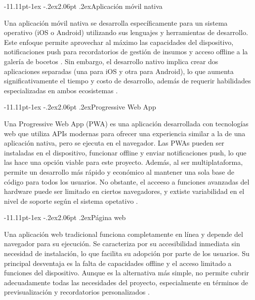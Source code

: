 \documentclass[12pt,letterpaper,oneside]{report}
\makeatletter
\renewcommand\subsection{\@startsection{subsection}{2}{\z@}%
  {-11.11pt\@plus -1ex \@minus -.2ex}{2.06pt \@plus .2ex}{\normalfont\normalsize\bfseries}}
\makeatother
\begin{document}
\subsection{Aplicación móvil nativa }

Una aplicación móvil nativa se desarrolla específicamente para un sistema operativo (iOS o Android) utilizando sus lenguajes y herramientas de desarrollo. Este enfoque permite aprovechar al máximo las capacidades del dispositivo, notificaciones push para recordatorios de gestión de insumos y acceso offline a la galería de bocetos \cite{qutub}\cite{zdnet}. Sin embargo, el desarrollo nativo implica crear dos aplicaciones separadas (una para iOS y otra para Android), lo que aumenta significativamente el tiempo y costo de desarrollo, además de requerir habilidades especializadas en ambos ecosistemas \cite{natively}.

\subsection{Progressive Web App}

Una Progressive Web App (PWA) es una aplicación desarrollada con tecnologías web que utiliza APIs modernas para ofrecer una experiencia similar a la de una aplicación nativa, pero se ejecuta en el navegador. Las PWAs pueden ser instaladas en el dispositivo, funcionar offline y enviar notificaciones push, lo que las hace una opción viable para este proyecto. Además, al ser multiplataforma, permite un desarrollo más rápido y económico al mantener una sola base de código para todos los usuarios. No obstante, el acceeso a funciones avanzadas del hardware puede ser limitado en ciertos navegadores, y extiste variabilidad en el nivel de soporte según el sistema opetativo \cite{fernandes2020}.

\subsection{Página web}

Una aplicación web tradicional funciona completamente en línea y depende del navegador para su ejecución. Se caracteriza por su accesibilidad inmediata sin necesidad de instalación, lo que facilita su adopción por parte de los usuarios. Su principal desventaja es la falta de capacidades offline y el acceso limitado a funciones del dispositivo. Aunque es la alternativa más simple, no permite cubrir adecuadamente todas las necesidades del proyecto, especialmente en términos de previsualización y recordatorios personalizados \cite{crovi2002}.
\end{document}
